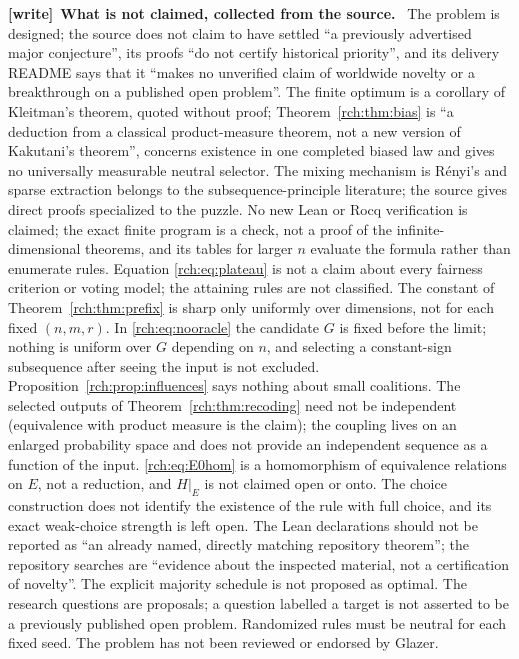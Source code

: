 \documentclass[11pt]{article}
\theoremstyle{definition}
\theoremstyle{remark}
\newenvironment{writenote}[1][]{\par\smallskip\begingroup\small
 \noindent\textbf{[write]}\if\relax\detokenize{#1}\relax\else~\textbf{#1.}\fi\ }%
 {\par\endgroup\smallskip}
\begin{document}
\begin{writenote}[What is not claimed, collected from the source]
The problem is designed; the source does not claim to have settled ``a
previously advertised major conjecture'', its proofs ``do not certify
historical priority'', and its delivery README says that it ``makes no
unverified claim of worldwide novelty or a breakthrough on a published open
problem''. The finite optimum is a corollary of Kleitman's theorem, quoted
without proof; Theorem~\ref{rch:thm:bias} is ``a deduction from a classical
product-measure theorem, not a new version of Kakutani's theorem'', concerns
existence in one completed biased law and gives no universally measurable
neutral selector. The mixing mechanism is R\'enyi's and sparse extraction
belongs to the subsequence-principle literature; the source gives direct
proofs specialized to the puzzle. No new Lean or Rocq verification is
claimed; the exact finite program is a check, not a proof of the
infinite-dimensional theorems, and its tables for larger $n$ evaluate the
formula rather than enumerate rules. Equation \eqref{rch:eq:plateau} is not
a claim about every fairness criterion or voting model; the attaining rules
are not classified. The constant of Theorem~\ref{rch:thm:prefix} is sharp
only uniformly over dimensions, not for each fixed $(n,m,r)$. In
\eqref{rch:eq:nooracle} the candidate $G$ is fixed before the limit; nothing
is uniform over $G$ depending on $n$, and selecting a constant-sign
subsequence after seeing the input is not excluded.
Proposition~\ref{rch:prop:influences} says nothing about small coalitions.
The selected outputs of Theorem~\ref{rch:thm:recoding} need not be
independent (equivalence with product measure is the claim); the coupling
lives on an enlarged probability space and does not provide an independent
sequence as a function of the input. \eqref{rch:eq:E0hom} is a homomorphism
of equivalence relations on $E$, not a reduction, and $H|_E$ is not claimed
open or onto. The choice construction does not identify the existence of
the rule with full choice, and its exact weak-choice strength is left open.
The Lean declarations should not be reported as ``an already named, directly
matching repository theorem''; the repository searches are ``evidence about
the inspected material, not a certification of novelty''. The explicit
majority schedule is not proposed as optimal. The research questions are
proposals; a question labelled a target is not asserted to be a previously
published open problem. Randomized rules must be neutral for each fixed seed.
The problem has not been reviewed or endorsed by Glazer.
\end{writenote}
\end{document}
